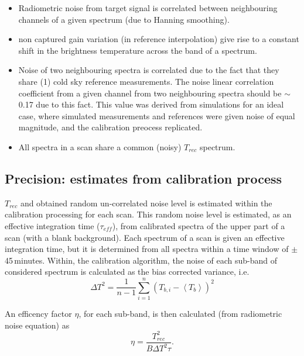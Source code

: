 \begin{itemize}

\item Radiometric noise from target signal is correlated between 
neighbouring channels of a given spectrum (due to Hanning smoothing).

\item non captured gain variation (in reference interpolation) give 
rise to a constant shift in the brightness temperature across the 
band of a spectrum.

\item Noise of two neighbouring spectra is correlated due to
the fact that they share (1) cold sky reference measurements. 
The noise linear correlation coefficient from a given channel
from two neighbouring spectra should be \(\sim\)\,0.17 due to this
fact. This value was derived from simulations for an ideal
case, where simulated measurements and references were 
given noise of equal magnitude, and the calibration
preocess replicated.

\item All spectra in a scan share a common (noisy) \(T_{rec}\)
spectrum. 

\end{itemize}

\subsection*{Precision: estimates from calibration process}

\(T_{rec}\) and obtained random un-correlated noise level is estimated within the 
calibration processing for each scan.
This random noise level is estimated, as an effective integration time
(\(\tau_{eff}\)), from calibrated spectra of the upper part of a scan 
(with a blank background). Each spectrum of a scan is given an effective
integration time, but it is determined from all spectra within a time
window of \(\pm\)45\,minutes. 
Within, the calibration algorithm, the noise of each sub-band of
considered spectrum is calculated as the bias corrected variance, i.e.
\begin{equation}
\Delta T^{2} = \frac{1}{n-1}\sum_{i=1}^{n}(T_{b,i}-\left<T_{b}\right>)^{2}
\end{equation}

An efficency factor \(\eta\), for each sub-band, is then calculated (from radiometric noise equation) as
\begin{equation}
\eta = \frac{T_{rec}^2}{B\Delta T^{2}\tau}.
\end{equation}

